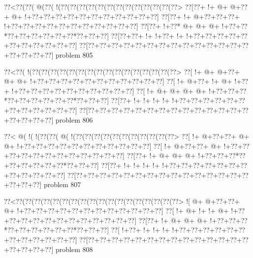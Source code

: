 \vbox{\vbox{\goo
\0??<\0??(\0??(\- @(\0??(\- !(\0??(\0??(\0??(\0??(\0??(\0??(\0??(\0??(\0??(\0??(\0??(\0??(\0??>
\0??[\0??+\- !+\- @+\- @+\0??+\- @+\- !+\0??+\0??+\0??+\0??+\0??+\0??+\0??+\0??+\0??+\0??+\0??]
\0??[\0??+\- !+\- @+\0??+\0??+\0??+\- !+\0??+\0??+\0??+\0??+\0??+\0??+\0??+\0??+\0??+\0??+\0??]
\0??[\0??+\- !+\0??*\- @+\- @+\- @+\- !+\0??+\0??*\0??+\0??+\0??+\0??+\0??+\0??*\0??+\0??+\0??]
\0??[\0??+\0??+\- !+\- !+\0??+\- !+\- !+\0??+\0??+\0??+\0??+\0??+\0??+\0??+\0??+\0??+\0??+\0??]
\0??[\0??+\0??+\0??+\0??+\0??+\0??+\0??+\0??+\0??+\0??+\0??+\0??+\0??+\0??+\0??+\0??+\0??+\0??]
}
\hfil problem 805\hfil\break
}



\vbox{\vbox{\goo
\0??<\0??(\- !(\0??(\0??(\0??(\0??(\0??(\0??(\0??(\0??(\0??(\0??(\0??(\0??(\0??(\0??(\0??(\0??>
\0??[\- !+\- @+\- @+\0??+\- @+\- @+\- !+\0??+\0??+\0??+\0??+\0??+\0??+\0??+\0??+\0??+\0??+\0??]
\0??[\- !+\- @+\0??+\- !+\- @+\- !+\0??+\- !+\0??+\0??+\0??+\0??+\0??+\0??+\0??+\0??+\0??+\0??]
\0??[\- !+\- @+\- @+\- @+\- @+\- !+\0??+\0??+\0??*\0??+\0??+\0??+\0??+\0??+\0??*\0??+\0??+\0??]
\0??[\0??+\- !+\- !+\- !+\- !+\- !+\0??+\0??+\0??+\0??+\0??+\0??+\0??+\0??+\0??+\0??+\0??+\0??]
\0??[\0??+\0??+\0??+\0??+\0??+\0??+\0??+\0??+\0??+\0??+\0??+\0??+\0??+\0??+\0??+\0??+\0??+\0??]
}
\hfil problem 806\hfil\break
}



\vbox{\vbox{\goo
\0??<\- @(\- !(\- !(\0??(\0??(\- @(\- !(\0??(\0??(\0??(\0??(\0??(\0??(\0??(\0??(\0??(\0??(\0??>
\0??[\- !+\- @+\0??+\0??+\- @+\- @+\- !+\0??+\0??+\0??+\0??+\0??+\0??+\0??+\0??+\0??+\0??+\0??]
\0??[\- !+\- @+\0??+\0??+\- @+\- !+\0??+\0??+\0??+\0??+\0??+\0??+\0??+\0??+\0??+\0??+\0??+\0??]
\0??[\0??+\- !+\- @+\- @+\- @+\- !+\0??+\0??+\0??*\0??+\0??+\0??+\0??+\0??+\0??*\0??+\0??+\0??]
\0??[\0??+\- !+\- !+\- !+\- !+\- !+\0??+\0??+\0??+\0??+\0??+\0??+\0??+\0??+\0??+\0??+\0??+\0??]
\0??[\0??+\0??+\0??+\0??+\0??+\0??+\0??+\0??+\0??+\0??+\0??+\0??+\0??+\0??+\0??+\0??+\0??+\0??]
}
\hfil problem 807\hfil\break
}



\vbox{\vbox{\goo
\0??<\0??(\0??(\0??(\0??(\0??(\0??(\0??(\0??(\0??(\0??(\0??(\0??(\0??(\0??(\0??(\0??(\0??(\0??>
\- ![\- @+\- @+\0??+\0??+\- @+\- !+\0??+\0??+\0??+\0??+\0??+\0??+\0??+\0??+\0??+\0??+\0??+\0??]
\0??[\- !+\- @+\- !+\- !+\- @+\- !+\0??+\0??+\0??+\0??+\0??+\0??+\0??+\0??+\0??+\0??+\0??+\0??]
\0??[\0??+\- !+\- @+\- @+\- @+\- !+\0??+\0??+\0??*\0??+\0??+\0??+\0??+\0??+\0??*\0??+\0??+\0??]
\0??[\- !+\0??+\- !+\- !+\- !+\- !+\0??+\0??+\0??+\0??+\0??+\0??+\0??+\0??+\0??+\0??+\0??+\0??]
\0??[\0??+\0??+\0??+\0??+\0??+\0??+\0??+\0??+\0??+\0??+\0??+\0??+\0??+\0??+\0??+\0??+\0??+\0??]
}
\hfil problem 808\hfil\break
}



